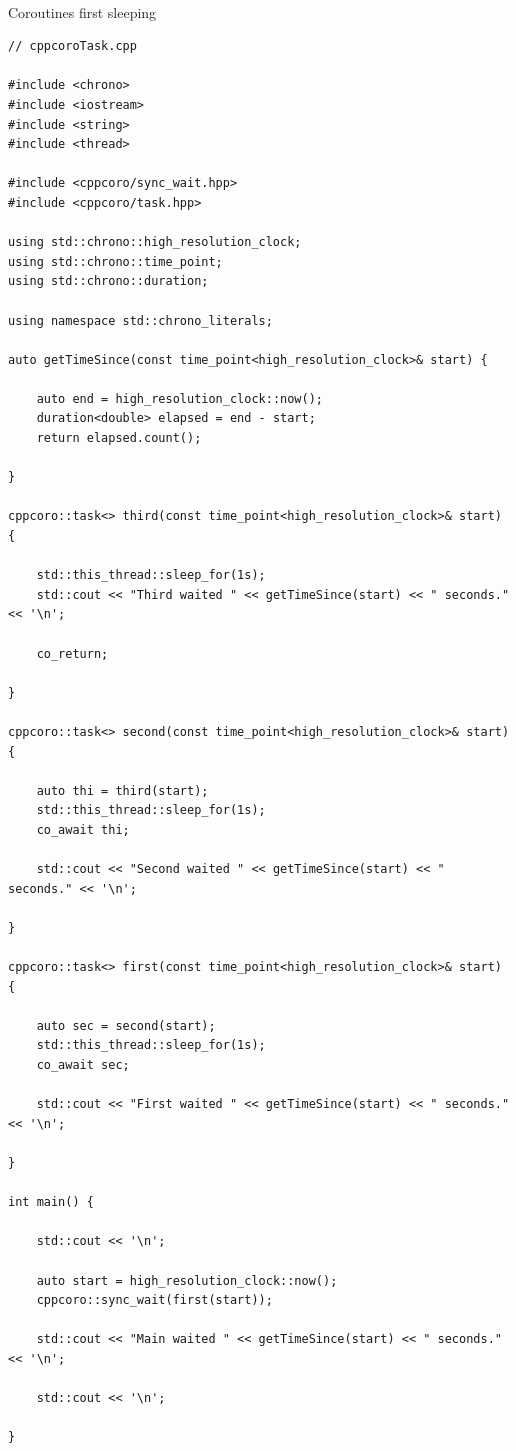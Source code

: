 \hspace*{\fill} \\ %
\noindent
Coroutines first sleeping
\begin{lstlisting}[style=styleCXX]
// cppcoroTask.cpp

#include <chrono>
#include <iostream>
#include <string>
#include <thread>

#include <cppcoro/sync_wait.hpp>
#include <cppcoro/task.hpp>

using std::chrono::high_resolution_clock;
using std::chrono::time_point;
using std::chrono::duration;

using namespace std::chrono_literals;

auto getTimeSince(const time_point<high_resolution_clock>& start) {

	auto end = high_resolution_clock::now();
	duration<double> elapsed = end - start;
	return elapsed.count();

}

cppcoro::task<> third(const time_point<high_resolution_clock>& start) {
	
	std::this_thread::sleep_for(1s);
	std::cout << "Third waited " << getTimeSince(start) << " seconds." << '\n';
	
	co_return;

}

cppcoro::task<> second(const time_point<high_resolution_clock>& start) {

	auto thi = third(start);
	std::this_thread::sleep_for(1s);
	co_await thi;
	
	std::cout << "Second waited " << getTimeSince(start) << " seconds." << '\n';

}

cppcoro::task<> first(const time_point<high_resolution_clock>& start) {

	auto sec = second(start);
	std::this_thread::sleep_for(1s);
	co_await sec;
	
	std::cout << "First waited " << getTimeSince(start) << " seconds." << '\n';

}

int main() {

	std::cout << '\n';
	
	auto start = high_resolution_clock::now();
	cppcoro::sync_wait(first(start));
	
	std::cout << "Main waited " << getTimeSince(start) << " seconds." << '\n';
	
	std::cout << '\n';

}
\end{lstlisting}

